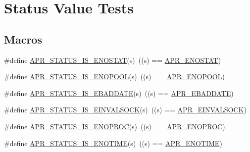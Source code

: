 \hypertarget{group___a_p_r___s_t_a_t_u_s___i_s}{}\section{Status Value Tests}
\label{group___a_p_r___s_t_a_t_u_s___i_s}
\subsection*{Macros}
\begin{DoxyCompactItemize}
\item 
\#define \mbox{\hyperlink{group___a_p_r___s_t_a_t_u_s___i_s_ga1f0d21900aa879ca4866b1bf846cfd0d}{A\+P\+R\+\_\+\+S\+T\+A\+T\+U\+S\+\_\+\+I\+S\+\_\+\+E\+N\+O\+S\+T\+AT}}(s)~((s) == \mbox{\hyperlink{group___a_p_r___error_ga7995805cf68be1fb16f684c544e45fbe}{A\+P\+R\+\_\+\+E\+N\+O\+S\+T\+AT}})
\item 
\#define \mbox{\hyperlink{group___a_p_r___s_t_a_t_u_s___i_s_ga71f149437af305f0a0cabde2cc3f3b19}{A\+P\+R\+\_\+\+S\+T\+A\+T\+U\+S\+\_\+\+I\+S\+\_\+\+E\+N\+O\+P\+O\+OL}}(s)~((s) == \mbox{\hyperlink{group___a_p_r___error_gaa8461873202e5e0b4c0ea261e05b07a9}{A\+P\+R\+\_\+\+E\+N\+O\+P\+O\+OL}})
\item 
\#define \mbox{\hyperlink{group___a_p_r___s_t_a_t_u_s___i_s_gaf1313bed3538d6d57995bca164ebac20}{A\+P\+R\+\_\+\+S\+T\+A\+T\+U\+S\+\_\+\+I\+S\+\_\+\+E\+B\+A\+D\+D\+A\+TE}}(s)~((s) == \mbox{\hyperlink{group___a_p_r___error_ga7911720c540a929cc08a2c25e606b56e}{A\+P\+R\+\_\+\+E\+B\+A\+D\+D\+A\+TE}})
\item 
\#define \mbox{\hyperlink{group___a_p_r___s_t_a_t_u_s___i_s_ga7fcc752663660de85fa046b2de014b97}{A\+P\+R\+\_\+\+S\+T\+A\+T\+U\+S\+\_\+\+I\+S\+\_\+\+E\+I\+N\+V\+A\+L\+S\+O\+CK}}(s)~((s) == \mbox{\hyperlink{group___a_p_r___error_ga548032b79ce0671d9986db0654858812}{A\+P\+R\+\_\+\+E\+I\+N\+V\+A\+L\+S\+O\+CK}})
\item 
\#define \mbox{\hyperlink{group___a_p_r___s_t_a_t_u_s___i_s_ga566f4c9b9db8a0c31199a938bdc4e38a}{A\+P\+R\+\_\+\+S\+T\+A\+T\+U\+S\+\_\+\+I\+S\+\_\+\+E\+N\+O\+P\+R\+OC}}(s)~((s) == \mbox{\hyperlink{group___a_p_r___error_ga18aa6d4ebaefda39478649c20bbeb9df}{A\+P\+R\+\_\+\+E\+N\+O\+P\+R\+OC}})
\item 
\#define \mbox{\hyperlink{group___a_p_r___s_t_a_t_u_s___i_s_ga65cb54d0b5902784037626841e26e709}{A\+P\+R\+\_\+\+S\+T\+A\+T\+U\+S\+\_\+\+I\+S\+\_\+\+E\+N\+O\+T\+I\+ME}}(s)~((s) == \mbox{\hyperlink{group___a_p_r___error_ga7acfb436774a21ae93ff5c1b89e7c4f5}{A\+P\+R\+\_\+\+E\+N\+O\+T\+I\+ME}})

\end{DoxyCompactItemize}
